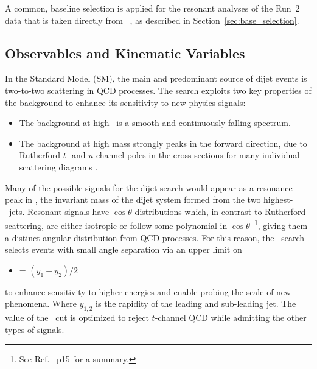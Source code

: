 A common, baseline selection is applied for the resonant  analyses of
the Run~2 data that is taken directly from ~\cite{Nishu:2646455}, as
described in Section~\ref{sec:base_selection}. 


\subsection{Observables and Kinematic Variables}
\label{sec:observables}
In the Standard Model (SM), the main and predominant source of dijet
events is two-to-two scattering in QCD processes. The search exploits
two key properties of the background to enhance its sensitivity to new
physics signals:

\begin{itemize}
	\item The background at high \mjj\ is a smooth and continuously falling spectrum.
	\item The background at high mass strongly peaks in the forward
direction, due to Rutherford $t$- and $u$-channel poles in the cross sections
for many individual scattering diagrams \cite{Harris:2011bh}.
\end{itemize}

Many of the possible signals for the dijet search would appear as a
resonance peak in \mjj, the invariant mass of the dijet system formed
from the two highest-\pT\ jets. Resonant signals have $\cos{\theta}$
distributions which, in contrast to Rutherford scattering, are either
isotropic or follow some polynomial in $\cos{\theta}$~\footnote{See
Ref.~\cite{Harris:2011bh} p15 for a summary.}, giving them a distinct
angular distribution from QCD processes. For this reason, the \mjj\
search selects events with small angle separation via an upper limit on
\begin{itemize}
	\item \ystar = $(y_1-y_2)/2$
\end{itemize}
to enhance sensitivity to higher energies and enable probing the scale
of new phenomena. Where $y_{1,2}$ is the rapidity of the leading and
sub-leading jet. The value of the \ystar\ cut is optimized to reject
$t$-channel QCD while admitting the other types of signals.

